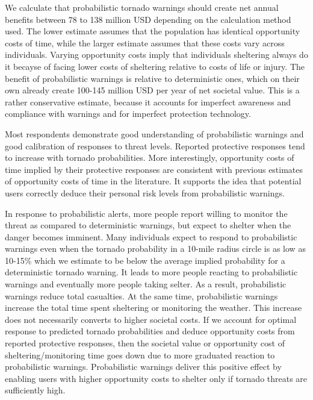 \documentclass{ametsocV6.1}
\begin{document}
We calculate that probabilistic tornado warnings should create net annual benefits between 78 to 138 million USD depending on the calculation method used. The lower estimate assumes that the population has identical opportunity costs of time, while the larger estimate assumes that these costs vary across individuals. Varying opportunity costs imply that individuals sheltering always do it becayse of facing lower costs of sheltering relative to costs of life or injury. The benefit of probabilistic warnings is relative to deterministic ones, which on their own already create 100-145 million USD per year of net societal value.  This is a rather conservative estimate, because it accounts for imperfect awareness and compliance with warnings and for imperfect protection technology.

Most respondents demonstrate good understanding of probabilistic warnings and good calibration of responses to threat levels. Reported protective responses tend to increase with tornado probabilities. More interestingly, opportunity costs of time implied by their protective responses are consistent with previous estimates of opportunity costs of time in the literature. It supports the idea that potential users correctly deduce their personal risk levels from probabilistic warnings. 

In response to probabilistic alerts, more people report willing to monitor the threat as compared to deterministic warnings, but expect to shelter when the danger becomes imminent.  Many individuals expect to respond to probabilistic warnings even when the tornado probability in a 10-mile radius circle is as low as 10-15\% which we estimate to be below the average implied probability for a deterministic tornado warning. It leads to more people reacting to probabilistic warnings and eventually more people taking selter. As a result, probabilistic warnings reduce total casualties. At the same time, probabilistic warnings increase the total time spent sheltering or monitoring the weather. This increase does not necessarily converts to higher societal costs. If we account for optimal response to predicted tornado probabilities and deduce opportunity costs from reported protective responses, then the societal value or opportunity cost of sheltering/monitoring time goes down due to more graduated reaction to probabilistic warnings. Probabilistic warnings deliver this positive effect by enabling users with higher opportunity costs to shelter only if tornado threats are sufficiently high. 
\end{document}
